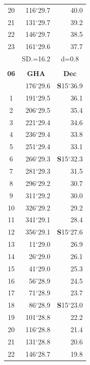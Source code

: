 \documentclass[10pt, a4paper]{report}
\begin{document}
\begin{scriptsize}
\begin{tabular*}{0.2\textwidth}[t]{@{\extracolsep{\fill}}|c|rr|}
20 & 116$^\circ$29.7 & 40.0\\
21 & 131$^\circ$29.7 & \raisebox{0.24ex}{\boldmath$\cdot$~\boldmath$\cdot$~~}39.2\\
22 & 146$^\circ$29.7 & 38.5\\
23 & 161$^\circ$29.6 & 37.7\\
\hline
\rule{0pt}{2.4ex} & \multicolumn{1}{c}{SD.=16.2} & \multicolumn{1}{c|}{d=0.8}\\
\hline
\multicolumn{1}{c}{}\\[-0.5ex]\hline
\multicolumn{1}{|c|}{\rule{0pt}{2.6ex}\textbf{06}} & \multicolumn{1}{c}{\textbf{GHA}} & \multicolumn{1}{c|}{\textbf{Dec}}\\
\hline\rule{0pt}{2.6ex}\noindent
0 & 176$^\circ$29.6 & \textbf{S}15$^\circ$36.9\\
1 & 191$^\circ$29.5 & 36.1\\
2 & 206$^\circ$29.5 & 35.4\\
3 & 221$^\circ$29.4 & \raisebox{0.24ex}{\boldmath$\cdot$~\boldmath$\cdot$~~}34.6\\
4 & 236$^\circ$29.4 & 33.8\\
5 & 251$^\circ$29.4 & 33.1\\[2Pt]
6 & 266$^\circ$29.3 & \textbf{S}15$^\circ$32.3\\
7 & 281$^\circ$29.3 & 31.5\\
8 & 296$^\circ$29.2 & 30.7\\
9 & 311$^\circ$29.2 & \raisebox{0.24ex}{\boldmath$\cdot$~\boldmath$\cdot$~~}30.0\\
10 & 326$^\circ$29.2 & 29.2\\
11 & 341$^\circ$29.1 & 28.4\\[2Pt]
12 & 356$^\circ$29.1 & \textbf{S}15$^\circ$27.6\\
13 & 11$^\circ$29.0 & 26.9\\
14 & 26$^\circ$29.0 & 26.1\\
15 & 41$^\circ$29.0 & \raisebox{0.24ex}{\boldmath$\cdot$~\boldmath$\cdot$~~}25.3\\
16 & 56$^\circ$28.9 & 24.5\\
17 & 71$^\circ$28.9 & 23.7\\[2Pt]
18 & 86$^\circ$28.9 & \textbf{S}15$^\circ$23.0\\
19 & 101$^\circ$28.8 & 22.2\\
20 & 116$^\circ$28.8 & 21.4\\
21 & 131$^\circ$28.8 & \raisebox{0.24ex}{\boldmath$\cdot$~\boldmath$\cdot$~~}20.6\\
22 & 146$^\circ$28.7 & 19.8\\

\end{tabular*}
\end{scriptsize}
\end{document}
